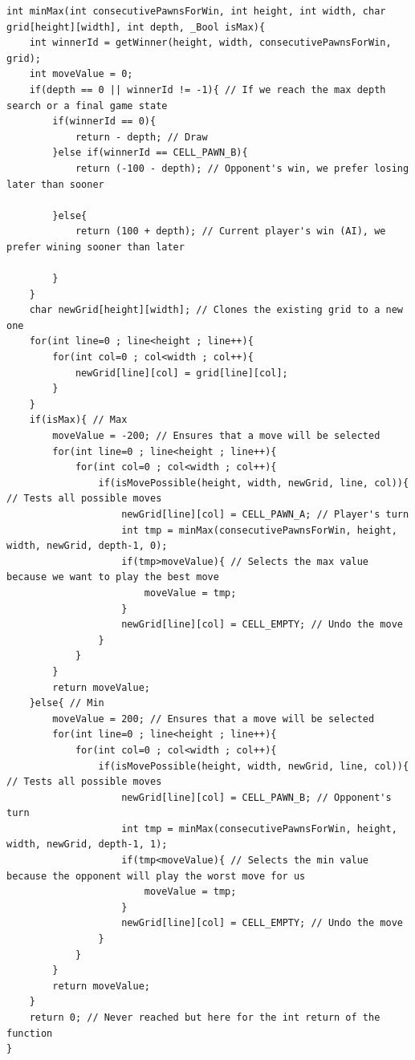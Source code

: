 \documentclass[10pt, a4paper]{article}
\begin{document}
\begin{lstlisting}[caption = Min Max]
int minMax(int consecutivePawnsForWin, int height, int width, char grid[height][width], int depth, _Bool isMax){
	int winnerId = getWinner(height, width, consecutivePawnsForWin, grid);
	int moveValue = 0;
	if(depth == 0 || winnerId != -1){ // If we reach the max depth search or a final game state
		if(winnerId == 0){
			return - depth; // Draw
		}else if(winnerId == CELL_PAWN_B){
			return (-100 - depth); // Opponent's win, we prefer losing later than sooner

		}else{
			return (100 + depth); // Current player's win (AI), we prefer wining sooner than later
			
		}
	}
	char newGrid[height][width]; // Clones the existing grid to a new one
	for(int line=0 ; line<height ; line++){ 
		for(int col=0 ; col<width ; col++){
			newGrid[line][col] = grid[line][col];
		}
	}
	if(isMax){ // Max
		moveValue = -200; // Ensures that a move will be selected
		for(int line=0 ; line<height ; line++){
			for(int col=0 ; col<width ; col++){
				if(isMovePossible(height, width, newGrid, line, col)){ // Tests all possible moves
					newGrid[line][col] = CELL_PAWN_A; // Player's turn
					int tmp = minMax(consecutivePawnsForWin, height, width, newGrid, depth-1, 0);
					if(tmp>moveValue){ // Selects the max value because we want to play the best move
						moveValue = tmp;
					}
					newGrid[line][col] = CELL_EMPTY; // Undo the move
				}
			}
		}
		return moveValue;
	}else{ // Min
		moveValue = 200; // Ensures that a move will be selected
		for(int line=0 ; line<height ; line++){
			for(int col=0 ; col<width ; col++){
				if(isMovePossible(height, width, newGrid, line, col)){ // Tests all possible moves
					newGrid[line][col] = CELL_PAWN_B; // Opponent's turn
					int tmp = minMax(consecutivePawnsForWin, height, width, newGrid, depth-1, 1);
					if(tmp<moveValue){ // Selects the min value because the opponent will play the worst move for us
						moveValue = tmp;
					}
					newGrid[line][col] = CELL_EMPTY; // Undo the move
				}
			}
		}
		return moveValue;
	}
	return 0; // Never reached but here for the int return of the function
}
\end{lstlisting}
\end{document}

